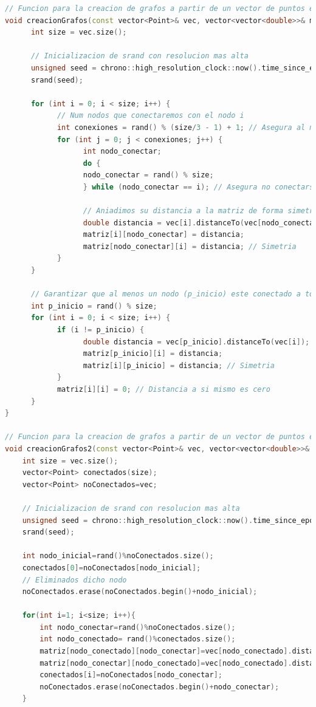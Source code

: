 \documentclass[11pt,openany]{book}
\begin{document}
\begin{lstlisting}[language=C++]
// Funcion para la creacion de grafos a partir de un vector de puntos en 2D
void creacionGrafos(const vector<Point>& vec, vector<vector<double>>& matriz) {
      int size = vec.size();
      
      // Inicializacion de srand con resolucion mas alta
      unsigned seed = chrono::high_resolution_clock::now().time_since_epoch().count();
      srand(seed);
      
      for (int i = 0; i < size; i++) {
            // Num nodos que conectaremos con el nodo i
            int conexiones = rand() % (size/3 - 1) + 1; // Asegura al menos una conexion por nodo
            for (int j = 0; j < conexiones; j++) {
                  int nodo_conectar;
                  do {
                  nodo_conectar = rand() % size;
                  } while (nodo_conectar == i); // Asegura no conectarse a si mismo
      
                  // Aniadimos su distancia a la matriz de forma simetrica
                  double distancia = vec[i].distanceTo(vec[nodo_conectar]);
                  matriz[i][nodo_conectar] = distancia;
                  matriz[nodo_conectar][i] = distancia; // Simetria
            }
      }
      
      // Garantizar que al menos un nodo (p_inicio) este conectado a todos los demas
      int p_inicio = rand() % size;
      for (int i = 0; i < size; i++) {
            if (i != p_inicio) {
                  double distancia = vec[p_inicio].distanceTo(vec[i]);
                  matriz[p_inicio][i] = distancia;
                  matriz[i][p_inicio] = distancia; // Simetria
            }
            matriz[i][i] = 0; // Distancia a si mismo es cero
      }
}

// Funcion para la creacion de grafos a partir de un vector de puntos en 2D
void creacionGrafos2(const vector<Point>& vec, vector<vector<double>>& matriz) {
    int size = vec.size();
    vector<Point> conectados(size);
    vector<Point> noConectados=vec;

    // Inicializacion de srand con resolucion mas alta
    unsigned seed = chrono::high_resolution_clock::now().time_since_epoch().count();
    srand(seed);

    int nodo_inicial=rand()%noConectados.size();
    conectados[0]=noConectados[nodo_inicial];
    // Eliminados dicho nodo
    noConectados.erase(noConectados.begin()+nodo_inicial);

    for(int i=1; i<size; i++){
        int nodo_conectar=rand()%noConectados.size();
        int nodo_conectado= rand()%conectados.size();
        matriz[nodo_conectado][nodo_conectar]=vec[nodo_conectado].distanceTo(vec[nodo_conectar]);
        matriz[nodo_conectar][nodo_conectado]=vec[nodo_conectado].distanceTo(vec[nodo_conectar]); // Parte simetrica
        conectados[i]=noConectados[nodo_conectar];
        noConectados.erase(noConectados.begin()+nodo_conectar);
    }


\end{lstlisting}
\end{document}
